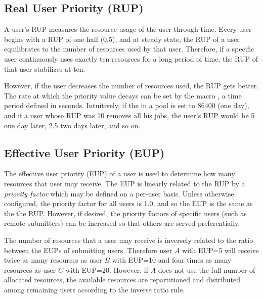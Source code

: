 \subsection{Real User Priority (RUP)}
A user's RUP measures the resource usage of the user 
through time.
Every user begins with a RUP of one half (0.5), and
at steady state, the RUP of a user equilibrates to the number of resources 
used by that user.  Therefore, if a specific user continuously uses exactly 
ten resources for a long period of time, the RUP of that user stabilizes at 
ten.

However, if the user decreases the number of resources used, the RUP
gets better.  The rate at which the priority value decays 
can be set by the macro , a time period 
defined in seconds.   Intuitively, if the  in a pool 
is set to 86400 (one day), and if a user whose RUP was 10 removes all his 
jobs, the user's RUP would be 5 one day later, 2.5 two days later,
and so on.

\subsection{Effective User Priority (EUP)}
The effective user priority (EUP) of a user is used to determine
how many resources that user may receive.
The EUP is linearly related to the RUP
by a \emph{priority factor} which may be defined on a per-user basis.
Unless otherwise configured, the priority factor for all users is 1.0,
and so the EUP is the same as the the RUP.
However, if desired, the priority factors of
specific users (such as remote submitters) can be increased so that 
others are served preferentially.

The number of resources that a user may receive is inversely related
to the ratio between the EUPs of submitting users.
Therefore user $A$ with EUP=5 will receive
twice as many resources as user $B$ with EUP=10 and four times as many 
resources as user $C$ with EUP=20.
However, if $A$ does not use the full number
of allocated resources,
the available resources are repartitioned and distributed among
remaining users according to the inverse ratio rule.



